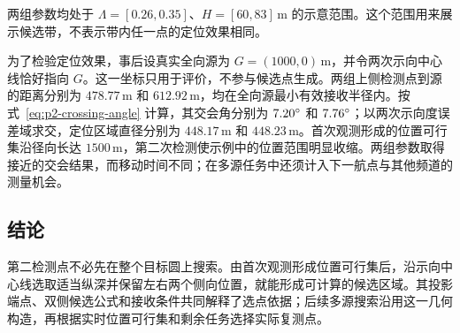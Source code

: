 两组参数均处于 \(\Lambda=[0.26,0.35]\)、\(H=[60,83]\,\mathrm{m}\) 的示意范围。这个范围用来展示候选带，不表示带内任一点的定位效果相同。

为了检验定位效果，事后设真实全向源为 \(G=(1000,0)\,\mathrm{m}\)，并令两次示向中心线恰好指向 \(G\)。这一坐标只用于评价，不参与候选点生成。两组上侧检测点到源的距离分别为 \(478.77\,\mathrm{m}\) 和 \(612.92\,\mathrm{m}\)，均在全向源最小有效接收半径内。按式~\eqref{eq:p2-crossing-angle} 计算，其交会角分别为 \(7.20^{\circ}\) 和 \(7.76^{\circ}\)；以两次示向度误差域求交，定位区域直径分别为 \(448.17\,\mathrm{m}\) 和 \(448.23\,\mathrm{m}\)。首次观测形成的位置可行集沿径向长达 \(1500\,\mathrm{m}\)，第二次检测使示例中的位置范围明显收缩。两组参数取得接近的交会结果，而移动时间不同；在多源任务中还须计入下一航点与其他频道的测量机会。

\subsection{结论}

第二检测点不必先在整个目标圆上搜索。由首次观测形成位置可行集后，沿示向中心线选取适当纵深并保留左右两个侧向位置，就能形成可计算的候选区域。其投影端点、双侧候选公式和接收条件共同解释了选点依据；后续多源搜索沿用这一几何构造，再根据实时位置可行集和剩余任务选择实际复测点。
